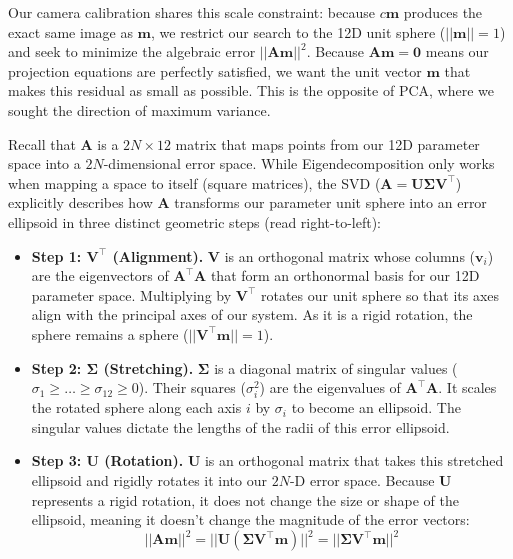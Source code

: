 \documentclass{csci1430}
\begin{document}
Our camera calibration shares this scale constraint: because $c\mathbf{m}$ produces the exact same image as $\mathbf{m}$, we restrict our search to the 12D unit sphere ($||\mathbf{m}|| = 1$) and seek to minimize the algebraic error $||\mathbf{A}\mathbf{m}||^2$. Because $\mathbf{A}\mathbf{m} = \mathbf{0}$ means our projection equations are perfectly satisfied, we want the unit vector $\mathbf{m}$ that makes this residual as small as possible. This is the opposite of PCA, where we sought the direction of maximum variance.

Recall that $\mathbf{A}$ is a $2N \times 12$ matrix that maps points from our 12D parameter space into a $2N$-dimensional error space. While Eigendecomposition only works when mapping a space to itself (square matrices), the SVD ($\mathbf{A} = \mathbf{U}\boldsymbol{\Sigma}\mathbf{V}^\top$) explicitly describes how $\mathbf{A}$ transforms our parameter unit sphere into an error ellipsoid in three distinct geometric steps (read right-to-left):
\begin{itemize}[leftmargin=12pt]
    \item \textbf{Step 1: $\mathbf{V}^\top$ (Alignment).} $\mathbf{V}$ is an orthogonal matrix whose columns ($\mathbf{v}_i$) are the eigenvectors of $\mathbf{A}^\top\mathbf{A}$ that form an orthonormal basis for our 12D parameter space. Multiplying by $\mathbf{V}^\top$ rotates our unit sphere so that its axes align with the principal axes of our system. As it is a rigid rotation, the sphere remains a sphere ($||\mathbf{V}^\top\mathbf{m}|| = 1$).
    \item \textbf{Step 2: $\boldsymbol{\Sigma}$ (Stretching).} $\boldsymbol{\Sigma}$ is a diagonal matrix of singular values ($\sigma_1 \ge \dots \ge \sigma_{12} \ge 0$). Their squares ($\sigma_i^2$) are the eigenvalues of $\mathbf{A}^\top\mathbf{A}$. It scales the rotated sphere along each axis $i$ by $\sigma_i$ to become an ellipsoid. The singular values dictate the lengths of the radii of this error ellipsoid.
    \item \textbf{Step 3: $\mathbf{U}$ (Rotation).} $\mathbf{U}$ is an orthogonal matrix that takes this stretched ellipsoid and rigidly rotates it into our $2N$-D error space. Because $\mathbf{U}$ represents a rigid rotation, it does not change the size or shape of the ellipsoid, meaning it doesn't change the magnitude of the error vectors:
    \[ ||\mathbf{A}\mathbf{m}||^2 = ||\mathbf{U}(\boldsymbol{\Sigma}\mathbf{V}^\top\mathbf{m})||^2 = ||\boldsymbol{\Sigma}\mathbf{V}^\top\mathbf{m}||^2 \]
\end{itemize}
\end{document}
